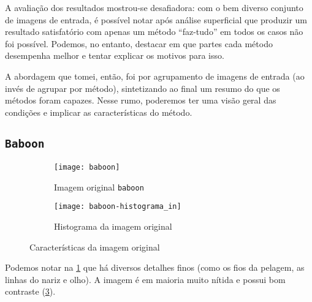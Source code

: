 \documentclass[brazilian,a4paper,twocolumn]{article}
\begin{document}
    A avaliação dos resultados mostrou-se desafiadora: com o bem diverso conjunto de imagens de entrada, é possível notar após análise superficial que produzir um resultado satisfatório com apenas um método ``faz-tudo'' em todos os casos não foi possível. Podemos, no entanto, destacar em que partes cada método desempenha melhor e tentar explicar os motivos para isso.

    A abordagem que tomei, então, foi por agrupamento de imagens de entrada (ao invés de agrupar por método), sintetizando ao final um resumo do que os métodos foram capazes. Nesse rumo, poderemos ter uma visão geral das condições e implicar as características do método.

    \subsection{\texttt{Baboon}}

        \begin{figure}
            \centering
            \begin{subfigure}{0.30\textwidth}
                \texttt{[image: baboon]}
                \caption{Imagem original \texttt{baboon}}
                \label{fig:baboon}
            \end{subfigure}
            \begin{subfigure}{0.5\textwidth}
                \texttt{[image: baboon-histograma\_in]}
                \caption{Histograma da imagem original}
                \label{fig:baboon-histograma}
            \end{subfigure}

            \caption{Características da imagem original}
        \end{figure}

        Podemos notar na \cref{fig:baboon} que há diversos detalhes finos (como os fios da pelagem, as linhas do nariz e olho). A imagem é em maioria muito nítida e possui bom contraste (\cref{fig:baboon-histograma}).
\end{document}
